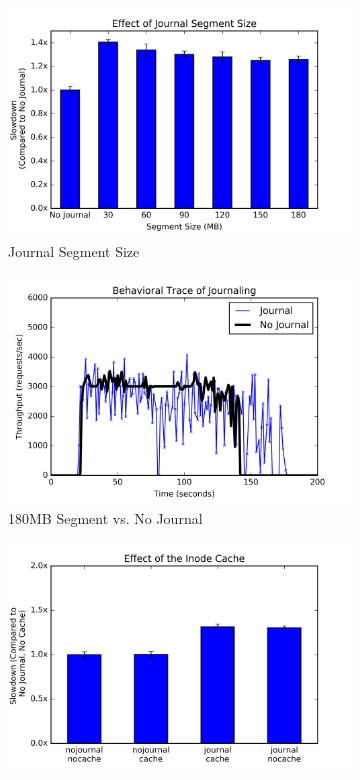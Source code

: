 \begin{figure}[t]
  \centering
  \begin{subfigure}[b]{.3\linewidth}
      \centering
      \includegraphics[width=1.0\linewidth]{graphs/slowdown-journal.png}
      \caption{Journal Segment Size} \label{fig:slowdown-journal-a}
  \end{subfigure}
  \begin{subfigure}[b]{.3\linewidth}
      \centering
      \includegraphics[width=1.0\linewidth]{graphs/behavior-journal.png}
      \caption{180MB Segment vs. No Journal}
      \label{fig:slowdown-journal-b}
  \end{subfigure}
  \begin{subfigure}[b]{.3\linewidth}
      \centering
      \includegraphics[width=1.0\linewidth]{graphs/slowdown-cache.png}

\end{subfigure}
\end{figure}
